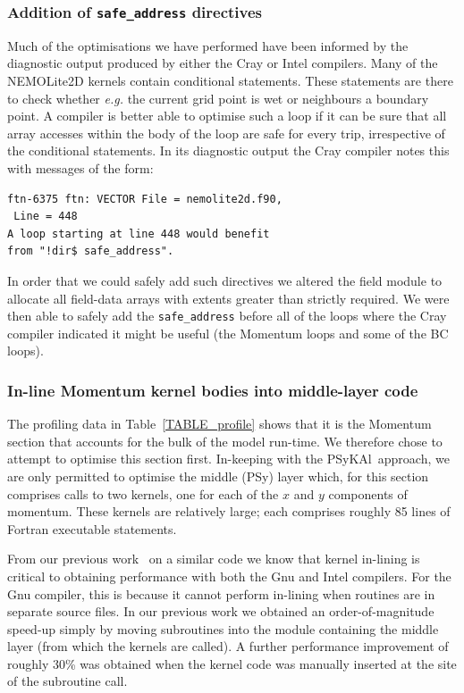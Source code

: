 \documentclass[journal]{IEEEtran}
\newcommand{\psykal}{{PS}y{KA}l}
\begin{document}
\subsubsection{Addition of {\tt safe\_address} directives}
\label{sec_safe_address}

Much of the optimisations we have performed have been informed by the
diagnostic output produced by either the Cray or Intel compilers. Many
of the NEMOLite2D kernels contain conditional statements. These
statements are there to check whether {\it e.g.} the current grid
point is wet or neighbours a boundary point. A compiler is better able
to optimise such a loop if it can be sure that all array accesses
within the body of the loop are safe for every trip, irrespective of
the conditional statements. In its diagnostic output the Cray compiler
notes this with messages of the form:
\begin{verbatim}
ftn-6375 ftn: VECTOR File = nemolite2d.f90,
 Line = 448 
A loop starting at line 448 would benefit 
from "!dir$ safe_address".
\end{verbatim}
In order that we could safely add such directives we altered the field
module to allocate all field-data arrays with extents greater than
strictly required.  We were then able to safely add the {\tt safe\_address}
before all of the loops where the Cray compiler indicated it might be
useful (the Momentum loops and some of the BC loops).

\subsubsection{In-line Momentum kernel bodies into middle-layer code}
\label{sec_inline_mom}

The profiling data in Table~\ref{TABLE_profile} shows that it is the
Momentum section that accounts for the bulk of the model run-time.  We
therefore chose to attempt to optimise this section first. In-keeping
with the \psykal\ approach, we are only permitted to optimise the middle
(PSy) layer which, for this section comprises calls to two kernels,
one for each of the $x$ and $y$ components of momentum. These kernels
are relatively large; each comprises roughly 85 lines of Fortran
executable statements.

From our previous work~\cite{shallow_psykal} on a similar code we know
that kernel in-lining is critical to obtaining performance with both
the Gnu and Intel compilers. For the Gnu compiler, this is because it
cannot perform in-lining when routines are in separate source
files. In our previous work we obtained an order-of-magnitude speed-up
simply by moving subroutines into the module containing the middle
layer (from which the kernels are called). A further performance
improvement of roughly 30\% was obtained when the kernel code was
manually inserted at the site of the subroutine call.
\end{document}
